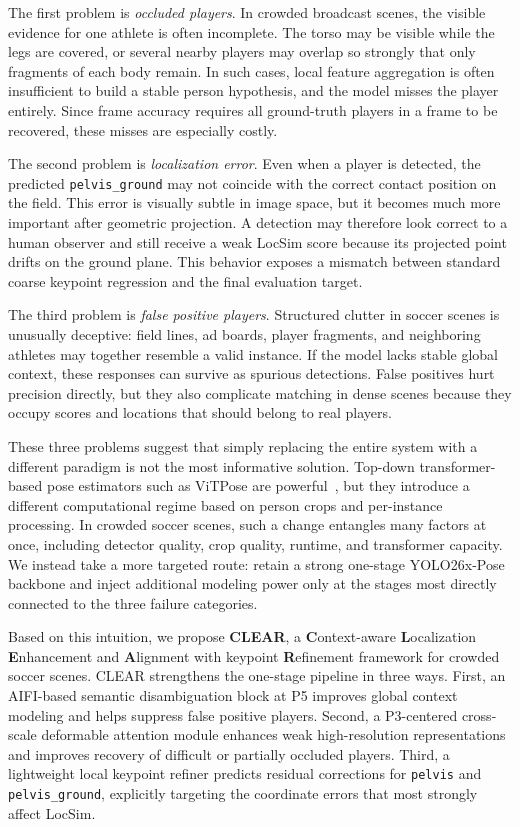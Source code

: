 \documentclass[runningheads]{llncs}
\begin{document}
The first problem is \emph{occluded players}. In crowded broadcast scenes, the visible evidence for one athlete is often incomplete. The torso may be visible while the legs are covered, or several nearby players may overlap so strongly that only fragments of each body remain. In such cases, local feature aggregation is often insufficient to build a stable person hypothesis, and the model misses the player entirely. Since frame accuracy requires all ground-truth players in a frame to be recovered, these misses are especially costly.

The second problem is \emph{localization error}. Even when a player is detected, the predicted \texttt{pelvis\_ground} may not coincide with the correct contact position on the field. This error is visually subtle in image space, but it becomes much more important after geometric projection. A detection may therefore look correct to a human observer and still receive a weak LocSim score because its projected point drifts on the ground plane. This behavior exposes a mismatch between standard coarse keypoint regression and the final evaluation target.

The third problem is \emph{false positive players}. Structured clutter in soccer scenes is unusually deceptive: field lines, ad boards, player fragments, and neighboring athletes may together resemble a valid instance. If the model lacks stable global context, these responses can survive as spurious detections. False positives hurt precision directly, but they also complicate matching in dense scenes because they occupy scores and locations that should belong to real players.

These three problems suggest that simply replacing the entire system with a different paradigm is not the most informative solution. Top-down transformer-based pose estimators such as ViTPose are powerful~\cite{xu2022vitpose}, but they introduce a different computational regime based on person crops and per-instance processing. In crowded soccer scenes, such a change entangles many factors at once, including detector quality, crop quality, runtime, and transformer capacity. We instead take a more targeted route: retain a strong one-stage YOLO26x-Pose backbone and inject additional modeling power only at the stages most directly connected to the three failure categories.

Based on this intuition, we propose \textbf{CLEAR}, a \textbf{C}ontext-aware \textbf{L}ocalization \textbf{E}nhancement and \textbf{A}lignment with keypoint \textbf{R}efinement framework for crowded soccer scenes. CLEAR strengthens the one-stage pipeline in three ways. First, an AIFI-based semantic disambiguation block at P5 improves global context modeling and helps suppress false positive players. Second, a P3-centered cross-scale deformable attention module enhances weak high-resolution representations and improves recovery of difficult or partially occluded players. Third, a lightweight local keypoint refiner predicts residual corrections for \texttt{pelvis} and \texttt{pelvis\_ground}, explicitly targeting the coordinate errors that most strongly affect LocSim.
\end{document}
